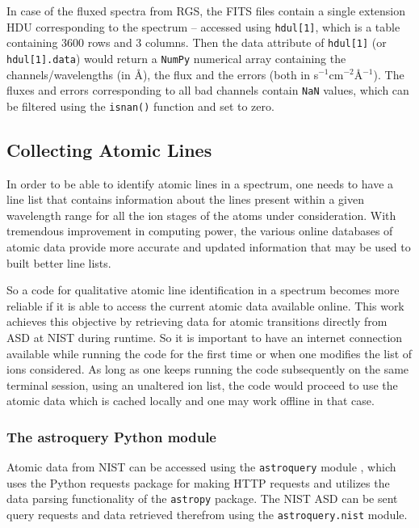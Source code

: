                 In case of the fluxed spectra from RGS, the FITS files contain a single extension HDU corresponding to the spectrum -- accessed using \texttt{hdul[1]}, which is a table containing 3600 rows and 3 columns. Then the data attribute of \texttt{hdul[1]} (or \texttt{hdul[1].data}) would return a \texttt{NumPy} numerical array containing the channels/wavelengths (in \AA), the flux and the errors (both in s$^{-1}$cm$^{-2}$\AA$^{-1}$). The fluxes and errors corresponding to all bad channels contain \texttt{NaN} values, which can be filtered using the \texttt{isnan()} function and set to zero.
        
        \subsection{Collecting Atomic Lines} \label{tool:rgs-files:line-collection}
            In order to be able to identify atomic lines in a spectrum, one needs to have a line list that contains information about the lines present within a given wavelength range for all the ion stages of the atoms under consideration. With tremendous improvement in computing power, the various online databases of atomic data provide more accurate and updated information that may be used to built better line lists.
            
            So a code for qualitative atomic line identification in a spectrum becomes more reliable if it is able to access the current atomic data available online. This work achieves this objective by retrieving data for atomic transitions directly from ASD at NIST during runtime. So it is important to have an internet connection available while running the code for the first time or when one modifies the list of ions considered. As long as one keeps running the code subsequently on the same terminal session, using an unaltered ion list, the code would proceed to use the atomic data which is cached locally and one may work offline in that case.
            
            \subsubsection{The astroquery Python module} \label{tool:rgs-files:line-collection:astroquery}
                Atomic data from NIST can be accessed using the \texttt{astroquery} module \cite{ginsburg2019astroquery}, which uses the Python requests package for making HTTP requests and utilizes the data parsing functionality of the \texttt{astropy} package. The NIST ASD can be sent query requests and data retrieved therefrom using the \texttt{astroquery.nist} module.
            

